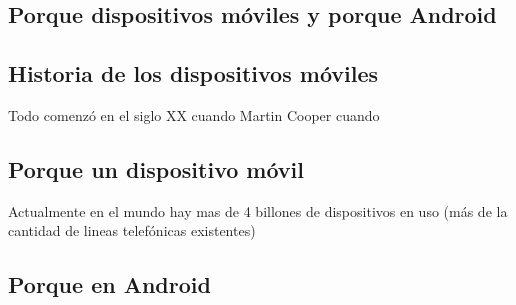 \documentclass[letterpaper,12pt,dvips]{book}
\newcommand{\fnz}{\footnotesize}
\newcounter{ejemplo}
\begin{document}
\begin{mainmatter}

 \pagestyle{fancyplain}
 \lhead[\fancyplain{}{}]
       {\fancyplain{}{\fnz{\rightmark}}}
 \rhead[\fancyplain{}{\fnz{\leftmark}}]
       {\fancyplain{}{}}


\part{Porque dispositivos móviles y porque Android}
\chapter{Historia de los dispositivos móviles}\label{cap:historia}

Todo comenzó en el siglo XX cuando Martin Cooper cuando 





\setcounter{ejemplo}{0}
\chapter{Porque un dispositivo móvil}\label{cap:moviles}

Actualmente en el mundo hay mas de 4 billones de dispositivos en uso (más de la cantidad de lineas telefónicas existentes)

	


\setcounter{ejemplo}{0}
\chapter{Porque en Android}



\end{mainmatter}
\end{document}
